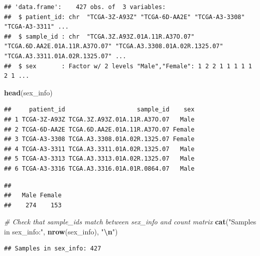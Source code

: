\documentclass[
]{article}
\newenvironment{Shaded}{\begin{snugshade}}{\end{snugshade}}
\newcommand{\CommentTok}[1]{\textcolor[rgb]{0.56,0.35,0.01}{\textit{#1}}}
\newcommand{\FunctionTok}[1]{\textcolor[rgb]{0.13,0.29,0.53}{\textbf{#1}}}
\newcommand{\NormalTok}[1]{#1}
\newcommand{\SpecialCharTok}[1]{\textcolor[rgb]{0.81,0.36,0.00}{\textbf{#1}}}
\newcommand{\StringTok}[1]{\textcolor[rgb]{0.31,0.60,0.02}{#1}}
\begin{document}
\begin{verbatim}
## 'data.frame':    427 obs. of  3 variables:
##  $ patient_id: chr  "TCGA-3Z-A93Z" "TCGA-6D-AA2E" "TCGA-A3-3308" "TCGA-A3-3311" ...
##  $ sample_id : chr  "TCGA.3Z.A93Z.01A.11R.A37O.07" "TCGA.6D.AA2E.01A.11R.A37O.07" "TCGA.A3.3308.01A.02R.1325.07" "TCGA.A3.3311.01A.02R.1325.07" ...
##  $ sex       : Factor w/ 2 levels "Male","Female": 1 2 2 1 1 1 1 1 2 1 ...
\end{verbatim}

\begin{Shaded}
\begin{Highlighting}[]
\FunctionTok{head}\NormalTok{(sex\_info)}
\end{Highlighting}
\end{Shaded}

\begin{verbatim}
##     patient_id                    sample_id    sex
## 1 TCGA-3Z-A93Z TCGA.3Z.A93Z.01A.11R.A37O.07   Male
## 2 TCGA-6D-AA2E TCGA.6D.AA2E.01A.11R.A37O.07 Female
## 3 TCGA-A3-3308 TCGA.A3.3308.01A.02R.1325.07 Female
## 4 TCGA-A3-3311 TCGA.A3.3311.01A.02R.1325.07   Male
## 5 TCGA-A3-3313 TCGA.A3.3313.01A.02R.1325.07   Male
## 6 TCGA-A3-3316 TCGA.A3.3316.01A.01R.0864.07   Male
\end{verbatim}

\begin{Shaded}
\end{Shaded}

\begin{verbatim}
## 
##   Male Female 
##    274    153
\end{verbatim}

\begin{Shaded}
\begin{Highlighting}[]
\CommentTok{\# Check that sample\_ids match between sex\_info and count matrix}
\FunctionTok{cat}\NormalTok{(}\StringTok{"Samples in sex\_info:"}\NormalTok{, }\FunctionTok{nrow}\NormalTok{(sex\_info), }\StringTok{"}\SpecialCharTok{\textbackslash{}n}\StringTok{"}\NormalTok{)}
\end{Highlighting}
\end{Shaded}

\begin{verbatim}
## Samples in sex_info: 427
\end{verbatim}
\end{document}
